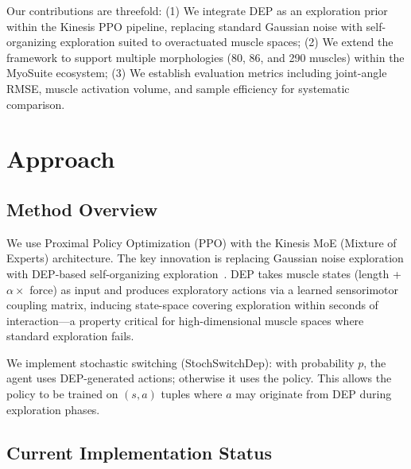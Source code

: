 \documentclass{article}
\begin{document}
Our contributions are threefold: (1) We integrate DEP as an exploration prior within the Kinesis PPO pipeline, replacing standard Gaussian noise with self-organizing exploration suited to overactuated muscle spaces; (2) We extend the framework to support multiple morphologies (80, 86, and 290 muscles) within the MyoSuite ecosystem; (3) We establish evaluation metrics including joint-angle RMSE, muscle activation volume, and sample efficiency for systematic comparison.

\section{Approach}

\subsection{Method Overview}

We use Proximal Policy Optimization (PPO) with the Kinesis MoE (Mixture of Experts) architecture. The key innovation is replacing Gaussian noise exploration with DEP-based self-organizing exploration~\cite{deprl2023}. DEP takes muscle states (length + $\alpha \times$ force) as input and produces exploratory actions via a learned sensorimotor coupling matrix, inducing state-space covering exploration within seconds of interaction---a property critical for high-dimensional muscle spaces where standard exploration fails.

We implement stochastic switching (StochSwitchDep): with probability $p$, the agent uses DEP-generated actions; otherwise it uses the policy. This allows the policy to be trained on $(s,a)$ tuples where $a$ may originate from DEP during exploration phases.

\subsection{Current Implementation Status}
\end{document}

